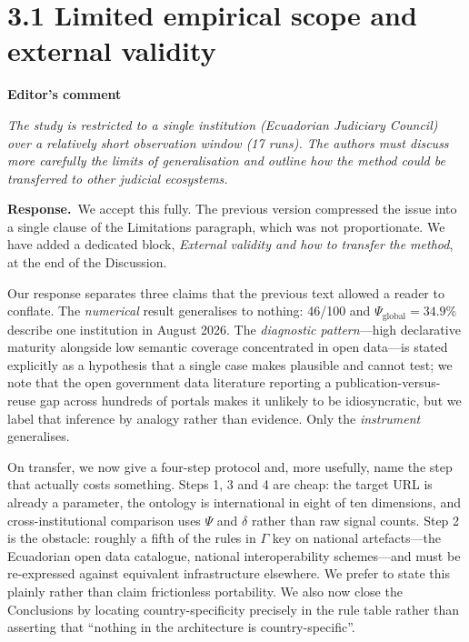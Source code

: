 \documentclass[11pt,a4paper]{article}
\newenvironment{comment}[1]
  {\par\vspace{6pt}\noindent\textbf{#1}\par\vspace{2pt}%
   \begin{mdframed}[backgroundcolor=cmtbg, linecolor=cmtrule, linewidth=0.6pt,
     innertopmargin=5pt, innerbottommargin=5pt, innerleftmargin=7pt,
     innerrightmargin=7pt, skipabove=2pt, skipbelow=5pt]\itshape}
  {\end{mdframed}}
\newcommand{\respuesta}{\par\noindent\textbf{Response.}\ }
\begin{document}
\hrulefill

\section*{3.1 Limited empirical scope and external validity}

\begin{comment}{Editor's comment}
The study is restricted to a single institution (Ecuadorian Judiciary Council) over a relatively short observation window (17 runs). The authors must discuss more carefully the limits of generalisation and outline how the method could be transferred to other judicial ecosystems.
\end{comment}

\respuesta We accept this fully. The previous version compressed the issue into a single clause of the Limitations paragraph, which was not proportionate. We have added a dedicated block, \emph{External validity and how to transfer the method}, at the end of the Discussion.

Our response separates three claims that the previous text allowed a reader to conflate. The \emph{numerical} result generalises to nothing: 46/100 and $\Psi_{\mathrm{global}}=34.9\%$ describe one institution in August 2026. The \emph{diagnostic pattern}---high declarative maturity alongside low semantic coverage concentrated in open data---is stated explicitly as a hypothesis that a single case makes plausible and cannot test; we note that the open government data literature reporting a publication-versus-reuse gap across hundreds of portals makes it unlikely to be idiosyncratic, but we label that inference by analogy rather than evidence. Only the \emph{instrument} generalises.

On transfer, we now give a four-step protocol and, more usefully, name the step that actually costs something. Steps 1, 3 and 4 are cheap: the target URL is already a parameter, the ontology is international in eight of ten dimensions, and cross-institutional comparison uses $\Psi$ and $\delta$ rather than raw signal counts. Step 2 is the obstacle: roughly a fifth of the rules in $\Gamma$ key on national artefacts---the Ecuadorian open data catalogue, national interoperability schemes---and must be re-expressed against equivalent infrastructure elsewhere. We prefer to state this plainly rather than claim frictionless portability. We also now close the Conclusions by locating country-specificity precisely in the rule table rather than asserting that ``nothing in the architecture is country-specific''.
\end{document}
